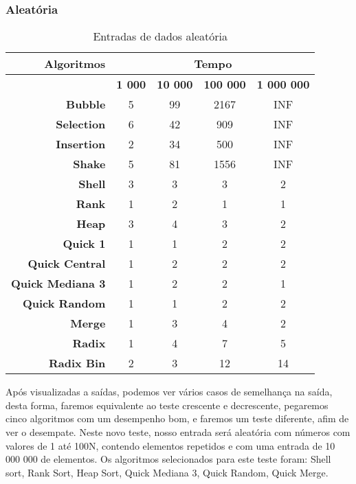 \documentclass[
	12pt,				%
	oneside,			%
	a4paper,			%
	english,			%
	brazil,				%
	]{article}
\begin{document}
\subsubsection{Aleat{\'o}ria}
\begin{table}[H]
\centering
\begin{tabular}{|r|c|c|c|c|}
\cline{1-5} 
 \textbf{Algoritmos} & \multicolumn{4}{|c|}{\textbf{Tempo}}  \\
 \hline
 \textbf{} & \textbf{1 000} & \textbf{10 000} & \textbf{100 000} & \textbf{1 000 000}\\
 \hline
 \textbf{Bubble} & 5 & 99 & 2167 & INF \\
 \hline
 \textbf{Selection} & 6 & 42 & 909 & INF \\
 \hline
 \textbf{Insertion} & 2 & 34 & 500 & INF \\
 \hline
 \textbf{Shake} & 5 & 81 & 1556 & INF \\
 \hline
 \textbf{Shell} & 3 & 3 & 3 & 2 \\
 \hline
 \textbf{Rank} & 1 & 2 & 1 & 1 \\
 \hline
 \textbf{Heap} & 3 & 4 & 3 & 2 \\
 \hline
 \textbf{Quick 1} & 1 & 1 & 2 & 2 \\
 \hline
 \textbf{Quick Central} & 1 & 2 & 2 & 2 \\
 \hline
 \textbf{Quick Mediana 3} & 1 & 2 & 2 & 1 \\
 \hline
 \textbf{Quick Random} & 1 & 1 & 2 & 2 \\
 \hline
 \textbf{Merge} & 1 & 3 & 4 & 2 \\
 \hline
 \textbf{Radix} & 1 & 4 & 7 & 5 \\
 \hline
 \textbf{Radix Bin} & 2 & 3 & 12 & 14 \\
 \hline
\end{tabular} 
\caption{Entradas de dados aleat{\'o}ria}
\end{table}
Após visualizadas a saídas, podemos ver vários casos de semelhança na saída, desta forma, faremos equivalente ao teste crescente e decrescente, pegaremos cinco algoritmos com 
um desempenho bom, e faremos um teste diferente, afim de ver o desempate. Neste novo teste, nosso entrada será aleatória com números com valores de 1 até 100N, contendo elementos repetidos 
e com uma entrada de 10 000 000 de elementos. Os algoritmos selecionados para este teste foram: Shell sort, Rank Sort, Heap Sort, Quick Mediana 3, Quick Random, Quick Merge.
\end{document}
